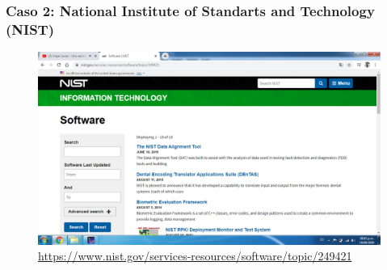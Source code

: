 \documentclass[11pt]{beamer}
\begin{document}
	\begin{frame}
		\frametitle{Caso 2: National Institute of Standarts and Technology (NIST)}
		\begin{figure}
			\centering
			\includegraphics[width=\textheight]{NIST.PNG}
			\caption{{\scriptsize \url{https://www.nist.gov/services-resources/software/topic/249421}}}
		\end{figure}
	\end{frame}
\end{document}
